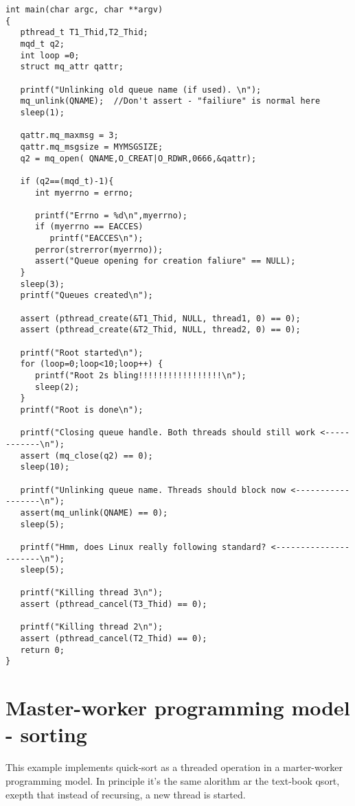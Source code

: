 \begin{table}[!hbp]
\begin{verbatim}
int main(char argc, char **argv)
{ 
   pthread_t T1_Thid,T2_Thid; 
   mqd_t q2;
   int loop =0;   
   struct mq_attr qattr;

   printf("Unlinking old queue name (if used). \n");  
   mq_unlink(QNAME);  //Don't assert - "failiure" is normal here
   sleep(1);

   qattr.mq_maxmsg = 3;
   qattr.mq_msgsize = MYMSGSIZE;
   q2 = mq_open( QNAME,O_CREAT|O_RDWR,0666,&qattr);  

   if (q2==(mqd_t)-1){      
      int myerrno = errno;

      printf("Errno = %d\n",myerrno);
      if (myerrno == EACCES)
         printf("EACCES\n");
      perror(strerror(myerrno)); 
      assert("Queue opening for creation faliure" == NULL); 
   }
   sleep(3);
   printf("Queues created\n"); 

   assert (pthread_create(&T1_Thid, NULL, thread1, 0) == 0); 
   assert (pthread_create(&T2_Thid, NULL, thread2, 0) == 0); 

   printf("Root started\n"); 
   for (loop=0;loop<10;loop++) {
      printf("Root 2s bling!!!!!!!!!!!!!!!!!\n");      
      sleep(2); 
   } 
   printf("Root is done\n");

   printf("Closing queue handle. Both threads should still work <------------\n");  
   assert (mq_close(q2) == 0);
   sleep(10);

   printf("Unlinking queue name. Threads should block now <------------------\n");    
   assert(mq_unlink(QNAME) == 0);
   sleep(5);

   printf("Hmm, does Linux really following standard? <----------------------\n");  
   sleep(5);

   printf("Killing thread 3\n");  
   assert (pthread_cancel(T3_Thid) == 0);

   printf("Killing thread 2\n");  
   assert (pthread_cancel(T2_Thid) == 0);
   return 0;
} 
\end{verbatim}
\caption{Main program - queues example.\label{q_main}}
\end{table}
\chapter{Master-worker programming model - sorting}
This example implements quick-sort as a threaded operation in a marter-worker programming model. In principle it's the same alorithm ar the text-book qsort, exepth that instead of recursing, a new thread is started.

